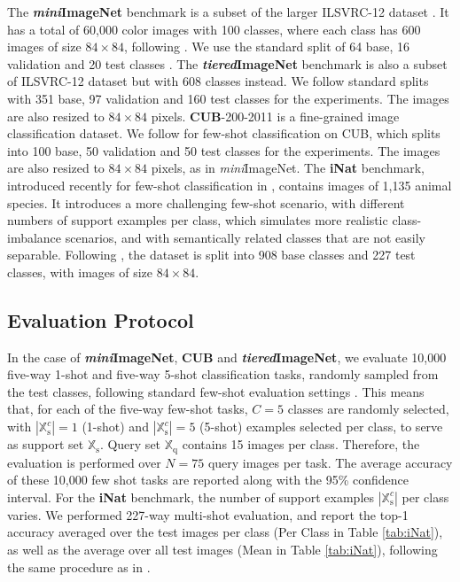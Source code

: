 \documentclass{article}
\newcommand{\XXs}{\mathbb{X}_{\text{s}}}
\newcommand{\XXq}{\mathbb{X}_{\text{q}}}
\begin{document}
The \textbf{\textit{mini}ImageNet} benchmark is a subset of the larger ILSVRC-12 dataset \cite{ILSVRC15}. It has a total of 60,000 color images with 100 classes, where each class has 600 images of size $84 \times 84$, following \cite{Vinyals2016MatchingNF}. We use the standard split of 64 base, 16 validation and 20 test classes \cite{Ravi2017OptimizationAA,wang2019simpleshot}. The \textbf{\textit{tiered}ImageNet} benchmark \cite{ren18fewshotssl} is also a subset of ILSVRC-12 dataset but with 608 classes instead. We follow standard splits with 351 base, 97 validation and 160 test classes for the experiments. The images are also resized to $84 \times 84$ pixels. \textbf{CUB}-200-2011 \cite{wah2011caltech} is a fine-grained image classification dataset. We follow \cite{chen2018a} for few-shot classification on CUB, which splits into 100 base, 50 validation and 50 test classes for the experiments. The images are also resized to $84 \times 84$ pixels, as in \textit{mini}ImageNet. The \textbf{iNat} benchmark, introduced recently for few-shot classification in \cite{wertheimer2019few}, contains images of 1,135 animal species. It introduces a more challenging few-shot scenario, with different numbers of support examples per class, which simulates more realistic class-imbalance scenarios, and with semantically related classes that are not easily separable. Following \cite{wertheimer2019few}, the dataset is split into 908 base classes and 227 test classes, with images of size $84 \times 84$.

\subsection{Evaluation Protocol}
In the case of \textbf{\textit{mini}ImageNet}, \textbf{CUB} and \textbf{\textit{tiered}ImageNet}, we evaluate 10,000 five-way 1-shot and five-way 5-shot classification tasks, randomly sampled from the test classes, following standard few-shot evaluation settings \cite{wang2019simpleshot,rusu2018metalearning}. This means that, for each of the five-way few-shot tasks, $C=5$ classes are randomly selected, with $|\XXs^c|=1$ (1-shot) and $|\XXs^c|=5$ (5-shot) examples selected per class, to serve as support set $\XXs$.
Query set $\XXq$ contains 15 images per class. Therefore, the evaluation is performed over $N=75$ query images per task. The average accuracy of these 10,000 few shot tasks are reported along with the 95\% confidence interval. For the \textbf{iNat} benchmark, the number of support examples $|\XXs^c|$ per class varies. We performed 227-way multi-shot evaluation, and report the top-1 accuracy averaged over the test images per class (Per Class in Table \ref{tab:iNat}), as well as the average over all test images (Mean in Table \ref{tab:iNat}), following the same procedure as in \cite{wertheimer2019few,wang2019simpleshot}. 
\end{document}
